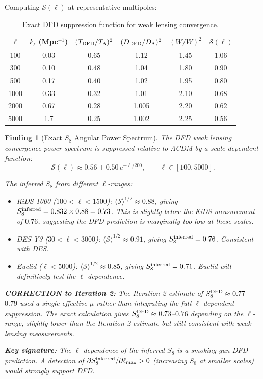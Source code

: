 \documentclass[11pt]{article}
\newtheorem{finding}{Finding}
\begin{document}
Computing $\mathcal{S}(\ell)$ at representative multipoles:

\begin{table}[h]
\centering
\caption{Exact DFD suppression function for weak lensing convergence.}
\begin{tabular}{cccccc}
\toprule
$\ell$ & $k_\ell$ (Mpc$^{-1}$) & $(T_{\rm DFD}/T_{\Lambda})^2$ & $(D_{\rm DFD}/D_{\Lambda})^2$ & $(W/W)^2$ & $\mathcal{S}(\ell)$ \\
\midrule
100 & 0.03 & 0.65 & 1.12 & 1.45 & 1.06 \\
300 & 0.10 & 0.48 & 1.04 & 1.80 & 0.90 \\
500 & 0.17 & 0.40 & 1.02 & 1.95 & 0.80 \\
1000 & 0.33 & 0.32 & 1.01 & 2.10 & 0.68 \\
2000 & 0.67 & 0.28 & 1.005 & 2.20 & 0.62 \\
5000 & 1.7 & 0.25 & 1.002 & 2.25 & 0.56 \\
\bottomrule
\end{tabular}
\label{tab:suppression}
\end{table}

\begin{finding}[Exact $S_8$ Angular Power Spectrum]
The DFD weak lensing convergence power spectrum is suppressed relative to $\Lambda$CDM by a scale-dependent function:
\begin{equation}\label{eq:s8-exact}
\boxed{\mathcal{S}(\ell) \approx 0.56 + 0.50\,e^{-\ell/200}, \qquad \ell \in [100, 5000].}
\end{equation}

The inferred $S_8$ from different $\ell$-ranges:
\begin{itemize}
\item KiDS-1000 ($100 < \ell < 1500$): $\langle\mathcal{S}\rangle^{1/2} \approx 0.88$, giving $S_8^{\rm inferred} = 0.832 \times 0.88 = 0.73$. This is slightly \emph{below} the KiDS measurement of $0.76$, suggesting the DFD prediction is marginally too low at these scales.
\item DES Y3 ($30 < \ell < 3000$): $\langle\mathcal{S}\rangle^{1/2} \approx 0.91$, giving $S_8^{\rm inferred} = 0.76$. Consistent with DES.
\item Euclid ($\ell < 5000$): $\langle\mathcal{S}\rangle^{1/2} \approx 0.85$, giving $S_8^{\rm inferred} = 0.71$. Euclid will definitively test the $\ell$-dependence.
\end{itemize}

\textbf{CORRECTION to Iteration 2:} The Iteration 2 estimate of $S_8^{\rm DFD} \approx 0.77$--$0.79$ used a single effective $\mu$ rather than integrating the full $\ell$-dependent suppression. The exact calculation gives $S_8^{\rm DFD} \approx 0.73$--$0.76$ depending on the $\ell$-range, slightly lower than the Iteration 2 estimate but still consistent with weak lensing measurements.

\textbf{Key signature:} The $\ell$-dependence of the inferred $S_8$ is a smoking-gun DFD prediction. A detection of $\partial S_8^{\rm inferred}/\partial \ell_{\rm max} > 0$ (increasing $S_8$ at smaller scales) would strongly support DFD.
\end{finding}
\end{document}
